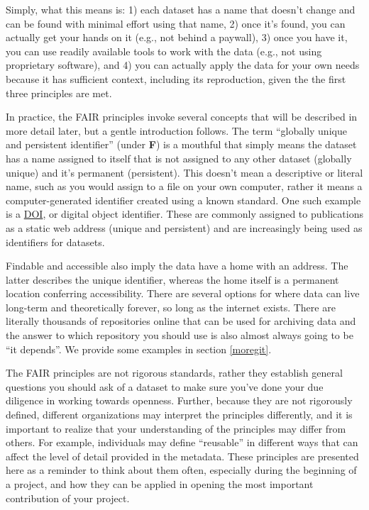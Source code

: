 \documentclass[
]{book}
\begin{document}
Simply, what this means is: 1) each dataset has a name that doesn't change and can be found with minimal effort using that name, 2) once it's found, you can actually get your hands on it (e.g., not behind a paywall), 3) once you have it, you can use readily available tools to work with the data (e.g., not using proprietary software), and 4) you can actually apply the data for your own needs because it has sufficient context, including its reproduction, given the the first three principles are met.

In practice, the FAIR principles invoke several concepts that will be described in more detail later, but a gentle introduction follows. The term ``globally unique and persistent identifier'' (under \textbf{F}) is a mouthful that simply means the dataset has a name assigned to itself that is not assigned to any other dataset (globally unique) and it's permanent (persistent). This doesn't mean a descriptive or literal name, such as you would assign to a file on your own computer, rather it means a computer-generated identifier created using a known standard. One such example is a \href{https://www.doi.org/}{DOI}, or digital object identifier. These are commonly assigned to publications as a static web address (unique and persistent) and are increasingly being used as identifiers for datasets.

Findable and accessible also imply the data have a home with an address. The latter describes the unique identifier, whereas the home itself is a permanent location conferring accessibility. There are several options for where data can live long-term and theoretically forever, so long as the internet exists. There are literally thousands of repositories online that can be used for archiving data and the answer to which repository you should use is also almost always going to be ``it depends''. We provide some examples in section \ref{moregit}.

The FAIR principles are not rigorous standards, rather they establish general questions you should ask of a dataset to make sure you've done your due diligence in working towards openness. Further, because they are not rigorously defined, different organizations may interpret the principles differently, and it is important to realize that your understanding of the principles may differ from others. For example, individuals may define ``reusable'' in different ways that can affect the level of detail provided in the metadata. These principles are presented here as a reminder to think about them often, especially during the beginning of a project, and how they can be applied in opening the most important contribution of your project.
\end{document}

